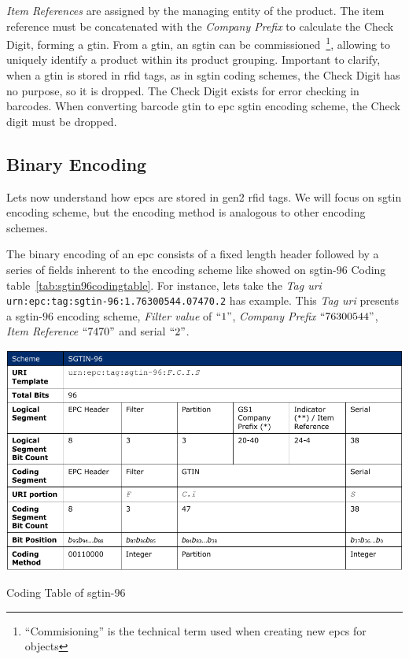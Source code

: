 \emph{Item References} are assigned by the managing entity of the product.
The item reference must be concatenated with the \emph{Company Prefix} to calculate the Check Digit, forming a \ac{gtin}.
From a \ac{gtin}, an \ac{sgtin} can be commissioned~\footnote{``Commisioning'' is the technical term used when creating new \acp{epc} for objects}, allowing to uniquely identify a product within its product grouping.
Important to clarify, when a \ac{gtin} is stored in \ac{rfid} tags, as in \ac{sgtin} coding schemes, the Check Digit has no purpose, so it is dropped. The Check Digit exists for error checking in barcodes. When converting barcode \ac{gtin} to \ac{epc} \ac{sgtin} encoding scheme, the Check digit must be dropped.

\subsection{Binary Encoding} \label{sec:binencoding}

Lets now understand how \acp{epc} are stored in \ac{gen2} \ac{rfid} tags.
We will focus on \ac{sgtin} encoding scheme, but the encoding method is analogous to other encoding schemes.

The binary encoding of an \ac{epc} consists of a fixed length header followed by a series of fields inherent to the encoding scheme like showed on \ac{sgtin}-$96$ Coding table~\ref{tab:sgtin96codingtable}.
For instance, lets take the \emph{Tag \ac{uri}}
\texttt{urn:epc:tag:sgtin-96:1.76300544.07470.2}
has example.
This \emph{Tag \ac{uri}} presents a \ac{sgtin}-$96$ encoding scheme, \emph{Filter value} of $``1"$, \emph{Company Prefix} $``76300544"$, \emph{Item Reference} $``7470"$ and serial $``2"$.

\begin{table}[]
    \centering
    \includegraphics[width=\textwidth]{./figs/02-state-of-the-art/table_codingtable.pdf}
    \caption[Coding Table of \ac{sgtin}-$96$]{Coding Table of \ac{sgtin}-$96$~\cite{EPCTagData}} 
    \label{tab:sgtin96codingtable}
\end{table}

